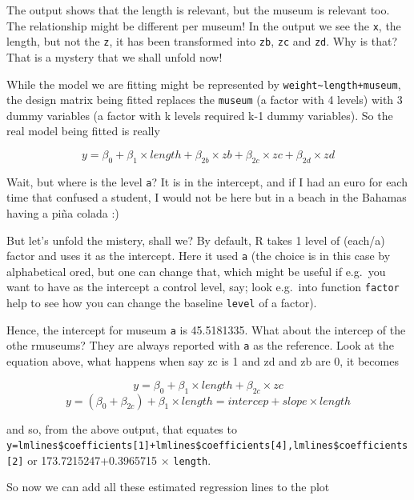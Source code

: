 \documentclass[
]{book}
\begin{document}
The output shows that the length is relevant, but the museum is relevant too. The relationship might be different per museum! In the output we see the \texttt{x}, the length, but not the \texttt{z}, it has been transformed into \texttt{zb}, \texttt{zc} and \texttt{zd}. Why is that? That is a mystery that we shall unfold now!

While the model we are fitting might be represented by \texttt{weight\textasciitilde{}length+museum}, the design matrix being fitted replaces the \texttt{museum} (a factor with 4 levels) with 3 dummy variables (a factor with k levels required k-1 dummy variables). So the real model being fitted is really

\[y=\beta_0+\beta_1 \times length + \beta_{2b} \times zb + \beta_{2c} \times zc + \beta_{2d} \times zd\]

Wait, but where is the level \texttt{a}? It is in the intercept, and if I had an euro for each time that confused a student, I would not be here but in a beach in the Bahamas having a piña colada :)

But let's unfold the mistery, shall we? By default, R takes 1 level of (each/a) factor and uses it as the intercept. Here it used \texttt{a} (the choice is in this case by alphabetical ored, but one can change that, which might be useful if e.g.~you want to have as the intercept a control level, say; look e.g.~into function \texttt{factor} help to see how you can change the baseline \texttt{level} of a factor).

Hence, the intercept for museum \texttt{a} is 45.5181335. What about the intercep of the othe rmuseums? They are always reported with \texttt{a} as the reference. Look at the equation above, what happens when say zc is 1 and zd and zb are 0, it becomes

\[y=\beta_0+\beta_1 \times length + \beta_{2c} \times zc \]
\[y=(\beta_0+\beta_{2c})+\beta_1 \times length = intercep + slope \times length\]

and so, from the above output, that equates to \texttt{y=lmlines\$coefficients{[}1{]}+lmlines\$coefficients{[}4{]},lmlines\$coefficients{[}2{]}} or 173.7215247+0.3965715 \(\times\) \texttt{length}.

So now we can add all these estimated regression lines to the plot
\end{document}
